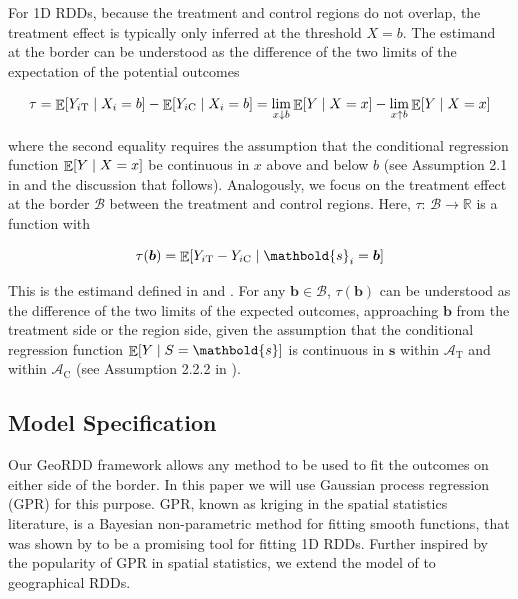 \documentclass[letter]{article}
\DeclarePairedDelimiter{\squarebracket}{\lbrack}{\rbrack}
\newcommand{\sbr}[1]{\squarebracket*{#1}}
\DeclareMathOperator{\E}{\mathbb{E}}
\newcommand{\area}{\mathcal{A}}
\newcommand{\treat}{\mathrm{T}}
\newcommand{\ctrol}{\mathrm{C}}
\newcommand{\svec}{\mathbold{s}}
\newcommand{\border}{\mathcal{B}}
\newcommand{\sentinel}{\bm{b}}
\newcommand{\eqlabel}[1]{\label{#1}}
\renewcommand{\cite}[1]{\citet{#1}}
\begin{document}
    	For 1D RDDs, because the treatment and control regions do not overlap, the treatment effect is typically only inferred at the threshold \(X=b\).
The estimand at the border can be understood as the difference of the two limits of the expectation of the potential outcomes

\begin{equation}
\eqlabel{eq:rdd_univ_estimand}
\tau = \E\sbr{Y_{i\treat} \mid X_i=b} - \E\sbr{Y_{i\ctrol} \mid X_i=b} = \lim_{x \downarrow b} \E\sbr{Y \mid X=x} - \lim_{x \uparrow b} \E\sbr{Y \mid X=x}
\end{equation}

where the second equality requires the assumption that the conditional regression function \(\E\sbr{Y \mid X=x}\) be continuous in \(x\) above and below \(b\) (see Assumption 2.1 in \cite{imbensrdd} and the discussion that follows).
Analogously, we focus on the treatment effect at the border \(\border\) between the treatment and control regions.
Here, \(\tau:\,\border \rightarrow \mathbb{R}\) is a function with

\begin{equation}
    \tau(\sentinel) =  \E\sbr{Y_{i\treat} - Y_{i\ctrol} \mid \svec_i = \sentinel}
\eqlabel{eq:functional_estimand}
\end{equation}

This is the estimand defined in \cite{imbens2011regression} and \cite{keeleoverview}.
For any \(\sentinel \in \border\), \(\tau(\sentinel)\) can be understood as the difference of the two limits of the expected outcomes, approaching \(\sentinel\) from the treatment side or the region side, given the assumption that the conditional regression function \(\E\sbr{Y \mid S=\svec}\) is continuous in \(\svec\) within \(\area_\treat\) and within \(\area_\ctrol\) (see Assumption 2.2.2 in \cite{imbens2011regression}).
    


    	\subsection{Model Specification}\label{model-specification}
    

\label{sec:twogp}
    	Our GeoRDD framework allows any method to be used to fit the outcomes on either side of the border.
In this paper we will use Gaussian process regression (GPR) for this purpose.
GPR, known as kriging in the spatial statistics literature, is a Bayesian non-parametric method for fitting smooth functions, that was shown by \cite{Branson:2017qy} to be a promising tool for fitting 1D RDDs.
Further inspired by the popularity of GPR in spatial statistics, we extend the model of \cite{Branson:2017qy} to geographical RDDs.
\end{document}
